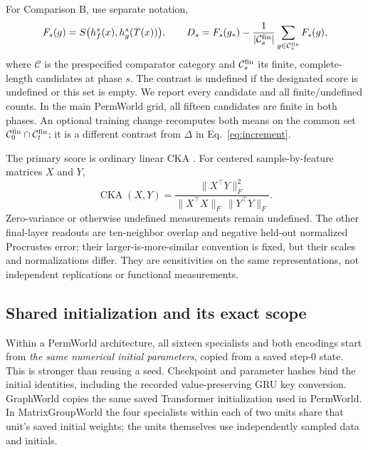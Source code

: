 \documentclass[10pt]{article}
\newcommand{\cka}{\operatorname{CKA}}
\begin{document}
For Comparison B, use separate notation,
\begin{equation}
 F_s(g)=S\bigl(h_f^s(x),h_g^s(T(x))\bigr),\qquad
 D_s=F_s(g_*)-\frac{1}{|\mathcal C_s^{\rm fin}|}\sum_{g\in\mathcal C_s^{\rm fin}}F_s(g),
 \label{eq:taskcontrast}
\end{equation}
where $\mathcal C$ is the prespecified comparator category and
$\mathcal C_s^{\rm fin}$ its finite, complete-length candidates at phase
$s$. The contrast is undefined if the designated score is undefined or this
set is empty. We report every candidate and all finite/undefined counts.
In the main PermWorld grid, all fifteen candidates are finite in both
phases. An optional training change recomputes both means on the common
set $\mathcal C_0^{\rm fin}\cap\mathcal C_t^{\rm fin}$; it is a different
contrast from $\Delta$ in Eq.~\ref{eq:increment}.

The primary score is ordinary linear CKA \citep{kornblith2019}. For centered
sample-by-feature matrices $X$ and $Y$,
\begin{equation}
 \cka(X,Y)=\frac{\|X^\top Y\|_F^2}
 {\|X^\top X\|_F\,\|Y^\top Y\|_F}.
\end{equation}
Zero-variance or otherwise undefined measurements remain undefined. The
other final-layer readouts are ten-neighbor overlap and negative held-out
normalized Procrustes error; their larger-is-more-similar convention is
fixed, but their scales and normalizations differ. They are sensitivities on the same
representations, not independent replications or functional measurements.

\subsection{Shared initialization and its exact scope}
\label{sec:sharedinit}
Within a PermWorld architecture, all sixteen specialists and both encodings
start from \emph{the same numerical initial parameters}, copied from a
saved step-0 state. This is stronger than reusing a seed. Checkpoint and
parameter hashes bind the initial identities, including the recorded
value-preserving GRU key conversion. GraphWorld copies the same saved
Transformer initialization used in PermWorld. In MatrixGroupWorld the four
specialists within each of two units share that unit's saved initial
weights; the units themselves use independently sampled data and initials.
\end{document}
